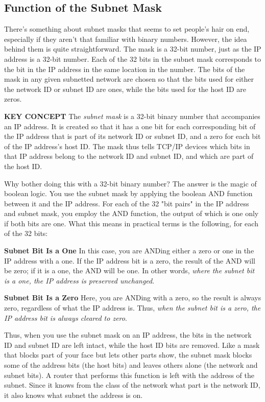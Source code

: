 \documentclass[b5paper,11pt]{memoir}
\begin{document}
\subsection{Function of the Subnet Mask}

There's something about subnet
\protect\hypertarget{ch18s03.htmlux5cux23idx-CHP-18-0722}{}{}masks that
seems to set people's hair on end, especially if they aren't that
familiar with binary numbers. However, the idea behind them is quite
straightforward. The mask is a 32-bit number, just as the IP address is
a 32-bit number. Each of the 32 bits in the
\protect\hypertarget{ch18s03.htmlux5cux23idx-CHP-18-0723}{}{}subnet mask
corresponds to the bit in the IP address in the same location in the
number. The bits of the mask in any given subnetted network are chosen
so that the bits used for either the network ID or subnet ID are ones,
while the bits used for the host ID are zeros.


{\textbf{KEY CONCEPT}} The {\emph{subnet mask}} is a 32-bit binary
number that accompanies an IP address. It is created so that it has a
one bit for each corresponding bit of the IP address that is part of its
network ID or subnet ID, and a zero for each bit of the IP address's
host ID. The mask thus tells TCP/IP devices which bits in that IP
address belong to the network ID and subnet ID, and which are part of
the host ID.

Why bother doing this with a 32-bit binary number? The answer is the
magic of boolean logic. You use the subnet mask by applying the boolean
AND function between it and the IP address. For each of the 32 "bit
pairs" in the IP address and subnet mask, you employ the AND function,
the output of which is one only if both bits are one. What this means in
practical terms is the following, for each of the 32 bits:

{\textbf{Subnet Bit Is a One}} In this case, you are ANDing either a
zero or one in the IP address with a one. If the IP address bit is a
zero, the result of the AND will be zero; if it is a one, the AND will
be one. In other words, {\emph{where the subnet bit is a one, the IP
address is preserved unchanged}}.

{\textbf{Subnet Bit Is a Zero}} Here, you are ANDing with a zero, so the
result is always zero, regardless of what the IP address is. Thus,
{\emph{when the subnet bit is a zero, the IP address bit is always
cleared to zero}}.

Thus, when you use the subnet mask on an IP address, the bits in the
network ID and subnet ID are left intact, while the host ID bits are
removed. Like a mask that blocks part of your face but lets other parts
show, the subnet mask blocks some of the address bits (the host bits)
and leaves others alone (the network and subnet bits). A router that
performs this function is left with the address of the subnet. Since it
knows from the class of the network what part is the network ID, it also
knows what subnet the address is on.
\end{document}
